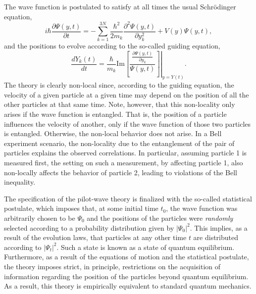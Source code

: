 \documentclass[letterpaper,12pt]{article}
\begin{document}
The wave function is postulated to satisfy at all times the usual Schr\"odinger equation,
 \begin{equation}
 i \hbar \frac{\partial \Psi (y, t)}{ \partial t } = - \sum_{k=1}^{3N} \frac{\hbar^2}{2 m_k} \frac{\partial^2 \Psi (y, t)}{\partial y_k^2} + V(y)\Psi (y, t) ,
 \end{equation}
and the positions to evolve according to the so-called guiding equation, 
\begin{equation}
\frac{d Y_k(t)}{dt} = \frac{\hbar}{m_k} \left. \text{Im}\left[ \frac{\frac{\partial \Psi (y, t)}{\partial y_k }}{ \Psi (y, t)} \right] \right\rvert_{y=Y(t)}.
\label{guide}
\end{equation}
The theory is clearly non-local since, according to the guiding equation, the velocity of a given particle at a given time may depend on the position of all the other particles at that same time. Note, however, that this non-locality only arises if the wave function is entangled. That is, the position of a particle influences the velocity of another, only if the wave function of those two particles is entangled. Otherwise, the non-local behavior does not arise. In a Bell experiment scenario, the non-locality due to the entanglement of the pair of particles explains the observed correlations. In particular, assuming particle 1 is measured first, the setting on such a measurement, by affecting particle 1, also non-locally affects the behavior of particle 2, leading to violations of the Bell inequality.

The specification of the pilot-wave theory is finalized with the so-called statistical postulate, which imposes that, at some initial time $t_0$, the wave function was arbitrarily chosen to be $\Psi_0$ and the positions of the particles were \emph{randomly} selected according to a probability distribution given by $|\Psi_0|^2$. This implies, as a result of the evolution laws, that particles at any other time $t$ are distributed according to $|\Psi_t|^2$. Such a state is known as a state of quantum equilibrium. Furthermore, as a result of the equations of motion and the statistical postulate, the theory imposes strict, in principle, restrictions on the acquisition of information regarding the position of the particles beyond quantum equilibrium. As a result, this theory is empirically equivalent to standard quantum mechanics.
 
\end{document}

